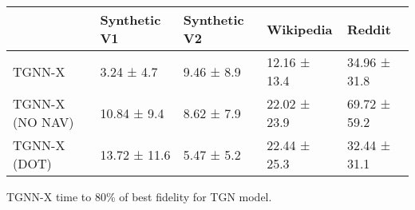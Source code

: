 \begin{tabular}{lllll}
\toprule
 & Synthetic V1 & Synthetic V2 & Wikipedia & Reddit \\
\midrule
TGNN-X & 3.24 ± 4.7 & 9.46 ± 8.9 & 12.16 ± 13.4 & 34.96 ± 31.8 \\
TGNN-X (NO NAV) & 10.84 ± 9.4 & 8.62 ± 7.9 & 22.02 ± 23.9 & 69.72 ± 59.2 \\
TGNN-X (DOT) & 13.72 ± 11.6 & 5.47 ± 5.2 & 22.44 ± 25.3 & 32.44 ± 31.1 \\
\bottomrule
\end{tabular}
\caption{\label{tab:tgn_time}TGNN-X time to 80\% of best fidelity for TGN model.}

